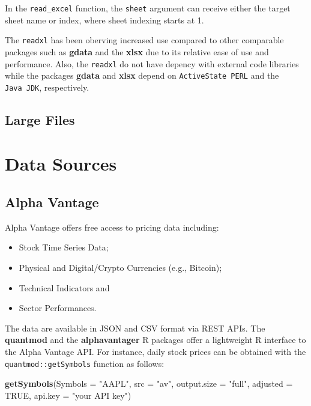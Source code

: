 \documentclass[]{book}
\newenvironment{Shaded}{\begin{snugshade}}{\end{snugshade}}
\newcommand{\KeywordTok}[1]{\textcolor[rgb]{0.13,0.29,0.53}{\textbf{#1}}}
\newcommand{\DataTypeTok}[1]{\textcolor[rgb]{0.13,0.29,0.53}{#1}}
\newcommand{\StringTok}[1]{\textcolor[rgb]{0.31,0.60,0.02}{#1}}
\newcommand{\OtherTok}[1]{\textcolor[rgb]{0.56,0.35,0.01}{#1}}
\newcommand{\NormalTok}[1]{#1}
\providecommand{\tightlist}{%
  \setlength{\itemsep}{0pt}\setlength{\parskip}{0pt}}
\begin{document}
In the \texttt{read\_excel} function, the \texttt{sheet} argument can
receive either the target sheet name or index, where sheet indexing
starts at 1.

The \texttt{readxl} has been oberving increased use compared to other
comparable packages such as \textbf{gdata} and the \textbf{xlsx} due to
its relative ease of use and performance. Also, the \texttt{readxl} do
not have depency with external code libraries while the packages
\textbf{gdata} and \textbf{xlsx} depend on \texttt{ActiveState\ PERL}
and the \texttt{Java\ JDK}, respectively.

\subsection{Large Files}\label{large-files}

\section{Data Sources}\label{data-sources}

\subsection{Alpha Vantage}\label{alpha-vantage}

Alpha Vantage offers free access to pricing data including:

\begin{itemize}
\tightlist
\item
  Stock Time Series Data;
\item
  Physical and Digital/Crypto Currencies (e.g., Bitcoin);
\item
  Technical Indicators and
\item
  Sector Performances.
\end{itemize}

The data are available in JSON and CSV format via REST APIs. The
\textbf{quantmod} and the \textbf{alphavantager} R packages offer a
lightweight R interface to the Alpha Vantage API. For instance, daily
stock prices can be obtained with the \texttt{quantmod::getSymbols}
function as follows:

\begin{Shaded}
\begin{Highlighting}[]
\KeywordTok{getSymbols}\NormalTok{(}\DataTypeTok{Symbols =} \StringTok{"AAPL"}\NormalTok{, }\DataTypeTok{src =} \StringTok{"av"}\NormalTok{, }\DataTypeTok{output.size =} \StringTok{"full"}\NormalTok{, }
  \DataTypeTok{adjusted =} \OtherTok{TRUE}\NormalTok{, }\DataTypeTok{api.key =} \StringTok{"your API key"}\NormalTok{)}
\end{Highlighting}
\end{Shaded}
\end{document}
